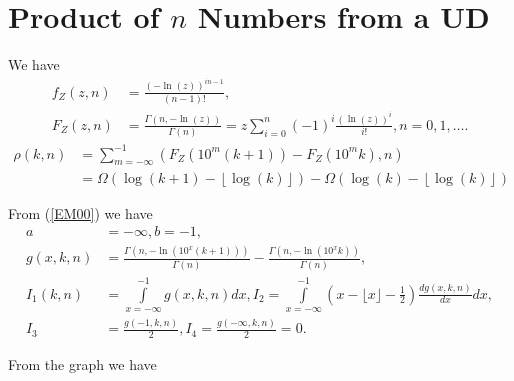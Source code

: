 \documentclass[titlepage,fleqn]{article}%
\begin{document}
\section{Product of $n$ Numbers from a UD}%

\label{PRNUD}%


\bigskip

We have%
\begin{align*}
f_{Z}(z,n)  &  =\frac{(-\ln(z))^{in-1}}{\left(  n-1\right)  !},\\
F_{Z}(z,n)  &  =\frac{\Gamma(n,-\ln(z))}{\Gamma(n)}=z%
{\displaystyle\sum\limits_{i=0}^{n}}
(-1)^{i}\frac{(\ln(z))^{i}}{i!},n=0,1,\ldots.
\end{align*}%
\begin{align*}
\rho(k,n)  &  =%
{\displaystyle\sum\limits_{m=-\infty}^{-1}}
\left(  F_{Z}(10^{m}(k+1))-F_{Z}(10^{m}k),n\right) \\
&  =\Omega\left(  \log(k+1)-\left\lfloor \log(k)\right\rfloor \right)
-\Omega\left(  \log(k)-\left\lfloor \log(k)\right\rfloor \right)
\end{align*}


\bigskip From (\ref{EM00}) we have
\begin{align}
a  &  =-\infty,b=-1,\label{ProdN}\\
g(x,k,n)  &  =\frac{\Gamma(n,-\ln(10^{x}(k+1)))}{\Gamma(n)}-\frac
{\Gamma(n,-\ln(10^{x}k))}{\Gamma(n)},\nonumber\\
I_{1}(k,n)  &  =%
{\displaystyle\int\limits_{x=-\infty}^{-1}}
g(x,k,n)dx,I_{2}=%
{\displaystyle\int\limits_{x=-\infty}^{-1}}
\left(  x-\lfloor x\rfloor-\frac{1}{2}\right)  \frac{dg(x,k,n)}{dx}%
dx,\nonumber\\
I_{3}  &  =\frac{g(-1,k,n)}{2},I_{4}=\frac{g(-\infty,k,n)}{2}=0.\nonumber
\end{align}


\bigskip From the graph we have%
\end{document}
